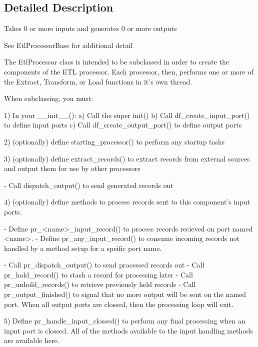\subsection{Detailed Description}
\begin{DoxyVerb}Takes 0 or more inputs and generates 0 or more outputs

See EtlProcessorBase for additional detail

The EtlProcessor class is intended to be subclassed in order to create 
the components of the ETL processor.  Each processor, then, performs one or
more of the Extract, Transform, or Load functions in it's own thread.

When subclassing, you must:

1)  In your __init__():
    a) Call the super init()
    b) Call df_create_input_port() to define input ports
    c) Call df_create_output_port() to define output ports

2)  (optionally) define starting_processor() to perform any startup tasks

3)  (optionally) define extract_records() to extract records from external
     sources and output them for use by other processors

       - Call dispatch_output() to send generated records out

4)  (optionally) define methods to process records sent to this component's 
    input ports.

      - Define pr_<name>_input_record() to process records recieved on
        port named <name>.
      - Define pr_any_input_record() to consume incoming records not handled
        by a method setup for a speific port name.

      - Call pr_dispatch_output() to send processed records out
      - Call pr_hold_record() to stash a record for processing later
      - Call pr_unhold_records() to retrieve previously held records
      - Call pr_output_finished() to signal that no more output will
        be sent on the named port.  When all output ports are clossed,
        then the processing loop will exit.

5)  Define pr_handle_input_clossed() to perform any final processing when
    an input port is clossed.  All of the methods available to the input
    handling methods are available here.
\end{DoxyVerb}
 

